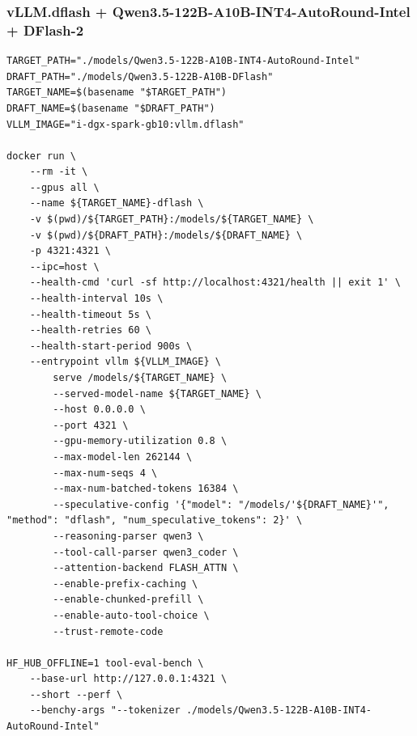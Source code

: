 \documentclass{article}
\begin{document}
\subsubsection{vLLM.dflash + Qwen3.5-122B-A10B-INT4-AutoRound-Intel + DFlash-2}
\begin{lstlisting}
TARGET_PATH="./models/Qwen3.5-122B-A10B-INT4-AutoRound-Intel"
DRAFT_PATH="./models/Qwen3.5-122B-A10B-DFlash"
TARGET_NAME=$(basename "$TARGET_PATH")
DRAFT_NAME=$(basename "$DRAFT_PATH")
VLLM_IMAGE="i-dgx-spark-gb10:vllm.dflash"

docker run \
    --rm -it \
    --gpus all \
    --name ${TARGET_NAME}-dflash \
    -v $(pwd)/${TARGET_PATH}:/models/${TARGET_NAME} \
    -v $(pwd)/${DRAFT_PATH}:/models/${DRAFT_NAME} \
    -p 4321:4321 \
    --ipc=host \
    --health-cmd 'curl -sf http://localhost:4321/health || exit 1' \
    --health-interval 10s \
    --health-timeout 5s \
    --health-retries 60 \
    --health-start-period 900s \
    --entrypoint vllm ${VLLM_IMAGE} \
        serve /models/${TARGET_NAME} \
        --served-model-name ${TARGET_NAME} \
        --host 0.0.0.0 \
        --port 4321 \
        --gpu-memory-utilization 0.8 \
        --max-model-len 262144 \
        --max-num-seqs 4 \
        --max-num-batched-tokens 16384 \
        --speculative-config '{"model": "/models/'${DRAFT_NAME}'", "method": "dflash", "num_speculative_tokens": 2}' \
        --reasoning-parser qwen3 \
        --tool-call-parser qwen3_coder \
        --attention-backend FLASH_ATTN \
        --enable-prefix-caching \
        --enable-chunked-prefill \
        --enable-auto-tool-choice \
        --trust-remote-code

HF_HUB_OFFLINE=1 tool-eval-bench \
    --base-url http://127.0.0.1:4321 \
    --short --perf \
    --benchy-args "--tokenizer ./models/Qwen3.5-122B-A10B-INT4-AutoRound-Intel"
\end{lstlisting}
\end{document}
